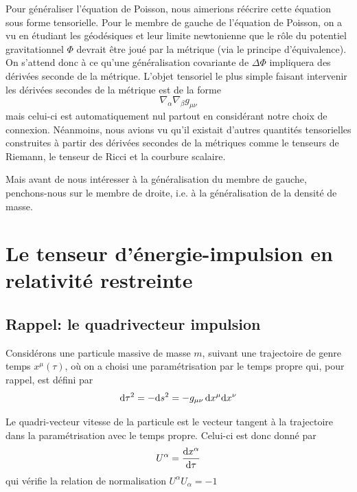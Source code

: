 Pour généraliser l'équation de Poisson, nous aimerions réécrire cette équation sous forme tensorielle. Pour le membre de gauche de l'équation de Poisson, on a vu en étudiant les géodésiques et leur limite newtonienne que le rôle du potentiel gravitationnel $\Phi$ devrait être joué par la métrique (via le principe d'équivalence). On s'attend donc à ce qu'une généralisation covariante de $\Delta \Phi$ impliquera des dérivées seconde de la métrique. L'objet tensoriel le plus simple faisant intervenir les dérivées secondes de la métrique est de la forme
\begin{equation}
    \nabla_{\alpha}\nabla_{\beta}g_{\mu \nu}
\end{equation}
mais celui-ci est automatiquement nul partout en considérant notre choix de connexion. Néanmoins, nous avions vu qu'il existait d'autres quantités tensorielles construites à partir des dérivées secondes de la métriques comme le tenseurs de Riemann, le tenseur de Ricci et la courbure scalaire. 

Mais avant de nous intéresser à la généralisation du membre de gauche, penchons-nous sur le membre de droite, i.e. à la généralisation de la densité de masse.

\section{Le tenseur d'énergie-impulsion en relativité restreinte}

\subsection{Rappel: le quadrivecteur impulsion}

Considérons une particule massive de masse $m$, suivant une trajectoire de genre temps $x^{\mu}(\tau)$, où on a choisi une paramétrisation par le temps propre qui, pour rappel, est défini par
\begin{equation}
    \mathrm{d} \tau ^2 = -\mathrm{d} s^2 = -g_{\mu \nu}\,\mathrm{d} x^{\mu}\mathrm{d} x^{\nu}
\end{equation}
\begin{theoremframe}
    \begin{defi}
        Le quadri-vecteur vitesse de la particule est le vecteur tangent à la trajectoire dans la paramétrisation avec le temps propre. Celui-ci est donc donné par
        \begin{equation}
            U^{\alpha} = \frac{\mathrm{d} x^{\alpha}}{\mathrm{d} \tau}
        \end{equation}
        qui vérifie la relation de normalisation $U^{\alpha}U_{\alpha} = -1$
    \end{defi}
\end{theoremframe}

